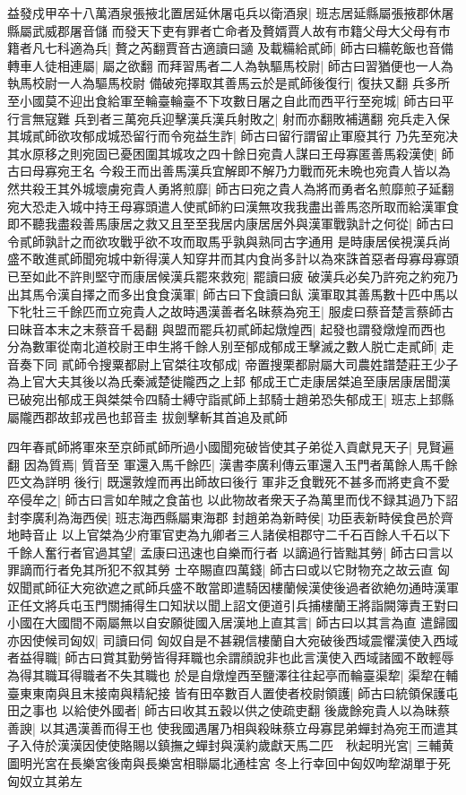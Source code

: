 益發戍甲卒十八萬酒泉張掖北置居延休屠屯兵以衛酒泉|{
	班志居延縣屬張掖郡休屠縣屬武威郡屠音儲}
而發天下吏有罪者亡命者及贅婿賈人故有市籍父母大父母有市籍者凡七科適為兵|{
	贅之芮翻賈音古適讀曰讁}
及載糒給貳師|{
	師古曰糒乾飯也音備}
轉車人徒相連屬|{
	屬之欲翻}
而拜習馬者二人為執驅馬校尉|{
	師古曰習猶便也一人為執馬校尉一人為驅馬校尉}
備破宛擇取其善馬云於是貳師後復行|{
	復扶又翻}
兵多所至小國莫不迎出食給軍至輪臺輪臺不下攻數日屠之自此而西平行至宛城|{
	師古曰平行言無寇難}
兵到者三萬宛兵迎擊漢兵漢兵射敗之|{
	射而亦翻敗補邁翻}
宛兵走入保其城貳師欲攻郁成城恐留行而令宛益生詐|{
	師古曰留行謂留止軍廢其行}
乃先至宛决其水原移之則宛固已憂困圍其城攻之四十餘日宛貴人謀曰王母寡匿善馬殺漢使|{
	師古曰母寡宛王名}
今殺王而出善馬漢兵宜解即不解乃力戰而死未晩也宛貴人皆以為然共殺王其外城壞虜宛貴人勇將煎靡|{
	師古曰宛之貴人為將而勇者名煎靡煎子延翻}
宛大恐走入城中持王母寡頭遣人使貳師約曰漢無攻我我盡出善馬恣所取而給漢軍食即不聽我盡殺善馬康居之救又且至至我居内康居居外與漢軍戰孰計之何從|{
	師古曰令貳師孰計之而欲攻戰乎欲不攻而取馬乎孰與熟同古字通用}
是時康居侯視漢兵尚盛不敢進貳師聞宛城中新得漢人知穿井而其内食尚多計以為來誅首惡者母寡母寡頭已至如此不許則堅守而康居候漢兵罷來救宛|{
	罷讀曰疲}
破漢兵必矣乃許宛之約宛乃出其馬令漢自擇之而多出食食漢軍|{
	師古曰下食讀曰飤}
漢軍取其善馬數十匹中馬以下牝牡三千餘匹而立宛貴人之故時遇漢善者名昧蔡為宛王|{
	服䖍曰蔡音楚言蔡師古曰昧音本末之末蔡音千曷翻}
與盟而罷兵初貳師起燉煌西|{
	起發也謂發燉煌而西也}
分為數軍從南北道校尉王申生將千餘人别至郁成郁成王擊滅之數人脱亡走貳師|{
	走音奏下同}
貳師令搜粟都尉上官桀往攻郁成|{
	帝置搜栗都尉屬大司農姓譜楚莊王少子為上官大夫其後以為氏秦滅楚徙隴西之上邽}
郁成王亡走康居桀追至康居康居聞漢已破宛出郁成王與桀桀令四騎士縛守詣貳師上邽騎士趙弟恐失郁成王|{
	班志上邽縣屬隴西郡故邽戎邑也邽音圭}
拔劍擊斬其首追及貳師

四年春貳師將軍來至京師貳師所過小國聞宛破皆使其子弟從入貢獻見天子|{
	見賢遍翻}
因為質焉|{
	質音至}
軍還入馬千餘匹|{
	漢書李廣利傳云軍還入玉門者萬餘人馬千餘匹文為詳明}
後行|{
	既還敦煌而再出師故曰後行}
軍非乏食戰死不甚多而將吏貪不愛卒侵牟之|{
	師古曰言如牟賊之食苖也}
以此物故者衆天子為萬里而伐不録其過乃下詔封李廣利為海西侯|{
	班志海西縣屬東海郡}
封趙弟為新畤侯|{
	功臣表新畤侯食邑於齊地畤音止}
以上官桀為少府軍官吏為九卿者三人諸侯相郡守二千石百餘人千石以下千餘人奮行者官過其望|{
	孟康曰迅速也自樂而行者}
以謫過行皆黜其勞|{
	師古曰言以罪謫而行者免其所犯不叙其勞}
士卒賜直四萬錢|{
	師古曰或以它財物充之故云直}
匈奴聞貳師征大宛欲遮之貳師兵盛不敢當即遣騎因樓蘭候漢使後過者欲絶勿通時漢軍正任文將兵屯玉門關捕得生口知狀以聞上詔文便道引兵捕樓蘭王將詣闕簿責王對曰小國在大國間不兩屬無以自安願徙國入居漢地上直其言|{
	師古曰以其言為直}
遣歸國亦因使候司匈奴|{
	司讀曰伺}
匈奴自是不甚親信樓蘭自大宛破後西域震懼漢使入西域者益得職|{
	師古曰賞其勤勞皆得拜職也余謂顔說非也此言漢使入西域諸國不敢輕辱為得其職耳得職者不失其職也}
於是自燉煌西至鹽澤往往起亭而輪臺渠犂|{
	渠犂在輔臺東東南與且末接南與精紀接}
皆有田卒數百人置使者校尉領護|{
	師古曰統領保護屯田之事也}
以給使外國者|{
	師古曰收其五穀以供之使疏吏翻}
後歲餘宛貴人以為昧蔡善諛|{
	以其遇漢善而得王也}
使我國遇屠乃相與殺昧蔡立母寡昆弟蟬封為宛王而遣其子入侍於漢漢因使使賂賜以鎮撫之蟬封與漢約歲獻天馬二匹　秋起明光宮|{
	三輔黄圖明光宮在長樂宮後南與長樂宮相聯屬北通桂宮}
冬上行幸回中匈奴呴犂湖單于死匈奴立其弟左

